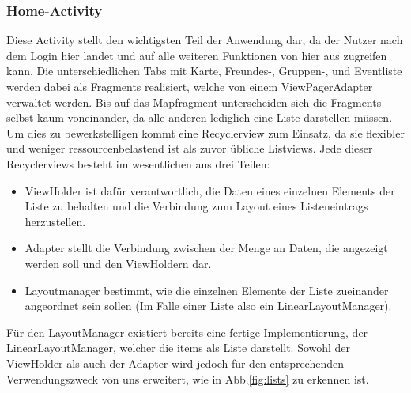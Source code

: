 \documentclass[parskip=full,11pt]{scrartcl}
\begin{document}
\subsubsection{Home-Activity}
Diese Activity stellt den wichtigsten Teil der Anwendung dar, da der Nutzer
nach dem Login hier landet und auf alle weiteren Funktionen von hier aus
zugreifen kann. Die unterschiedlichen Tabs mit Karte, Freundes-, Gruppen-, und
Eventliste werden dabei als Fragments realisiert, welche von einem
ViewPagerAdapter verwaltet werden. Bis auf das Mapfragment unterscheiden sich
die Fragments selbst kaum voneinander, da alle anderen lediglich eine Liste
darstellen müssen. Um dies zu bewerkstelligen kommt eine Recyclerview zum
Einsatz, da sie flexibler und weniger ressourcenbelastend ist als zuvor
übliche Listviews. Jede dieser Recyclerviews besteht im wesentlichen aus
drei Teilen:
\begin{itemize}
	\item{ViewHolder} ist dafür verantwortlich, die Daten eines einzelnen
        Elements der Liste zu behalten und die Verbindung zum Layout eines
        Listeneintrags herzustellen.
	\item{Adapter} stellt die Verbindung zwischen der Menge an Daten, die
        angezeigt werden soll und den ViewHoldern dar.
	\item{Layoutmanager} bestimmt, wie die einzelnen Elemente der Liste
        zueinander angeordnet sein sollen
        (Im Falle einer Liste also ein LinearLayoutManager).
\end{itemize}
Für den LayoutManager existiert bereits eine fertige Implementierung, der
LinearLayoutManager, welcher die items als Liste darstellt. Sowohl der
ViewHolder als auch der Adapter wird jedoch für den entsprechenden
Verwendungszweck von uns erweitert, wie in Abb.\ref{fig:lists} zu erkennen ist.
\end{document}
